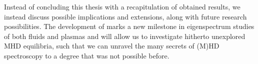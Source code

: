 Instead of concluding this thesis with a recapitulation of obtained results, we instead discuss possible implications and extensions, along with future research possibilities. The development of {\legolas} marks a new milestone in eigenspectrum studies of both fluids and plasmas and will allow us to investigate hitherto unexplored MHD equilibria, such that we can unravel the many secrets of (M)HD spectroscopy to a degree that was not possible before.




\cleardoublepage
